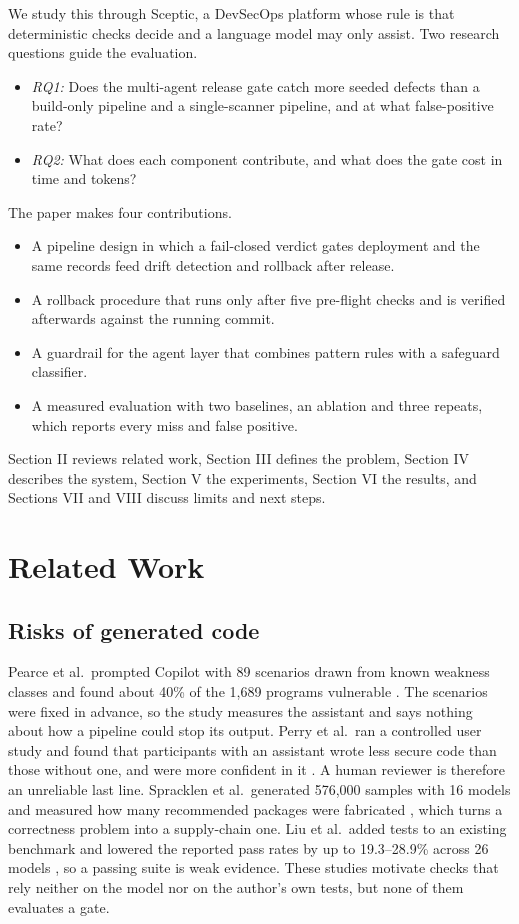 \documentclass[12pt,onecolumn,draftclsnofoot]{IEEEtran}
\begin{document}
We study this through Sceptic, a DevSecOps platform whose rule is that deterministic checks decide and a language model may only assist. Two research questions guide the evaluation.
\begin{itemize}
\item \emph{RQ1:} Does the multi-agent release gate catch more seeded defects than a build-only pipeline and a single-scanner pipeline, and at what false-positive rate?
\item \emph{RQ2:} What does each component contribute, and what does the gate cost in time and tokens?
\end{itemize}
The paper makes four contributions.
\begin{itemize}
\item A pipeline design in which a fail-closed verdict gates deployment and the same records feed drift detection and rollback after release.
\item A rollback procedure that runs only after five pre-flight checks and is verified afterwards against the running commit.
\item A guardrail for the agent layer that combines pattern rules with a safeguard classifier.
\item A measured evaluation with two baselines, an ablation and three repeats, which reports every miss and false positive.
\end{itemize}
Section II reviews related work, Section III defines the problem, Section IV describes the system, Section V the experiments, Section VI the results, and Sections VII and VIII discuss limits and next steps.

\section{Related Work}
\subsection{Risks of generated code}
Pearce et al.\ prompted Copilot with 89 scenarios drawn from known weakness classes and found about 40\% of the 1,689 programs vulnerable \cite{pearce2022}. The scenarios were fixed in advance, so the study measures the assistant and says nothing about how a pipeline could stop its output. Perry et al.\ ran a controlled user study and found that participants with an assistant wrote less secure code than those without one, and were more confident in it \cite{perry2023}. A human reviewer is therefore an unreliable last line. Spracklen et al.\ generated 576,000 samples with 16 models and measured how many recommended packages were fabricated \cite{spracklen2025}, which turns a correctness problem into a supply-chain one. Liu et al.\ added tests to an existing benchmark and lowered the reported pass rates by up to 19.3--28.9\% across 26 models \cite{liu2023evalplus}, so a passing suite is weak evidence. These studies motivate checks that rely neither on the model nor on the author's own tests, but none of them evaluates a gate.
\end{document}
